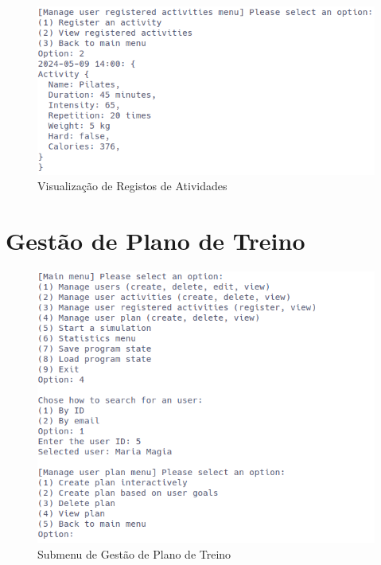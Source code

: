 \documentclass[a4paper,12pt]{scrreprt}
\begin{document}
    \begin{figure}[!ht]
        \centering
        \includegraphics[width=\textwidth]{images/viewActivitiesRegister.png}
        \caption{Visualização de Registos de Atividades}
        \label{fig:view-activities-register}
    \end{figure}

\clearpage
\section{Gestão de Plano de Treino}
    \label{sec:gestao-plano-treino}

    \begin{figure}[!ht]
        \centering
        \includegraphics[width=\textwidth]{images/managePlanSubMenu.png}
        \caption{Submenu de Gestão de Plano de Treino}
        \label{fig:submenu-plan}
    \end{figure}
\end{document}
